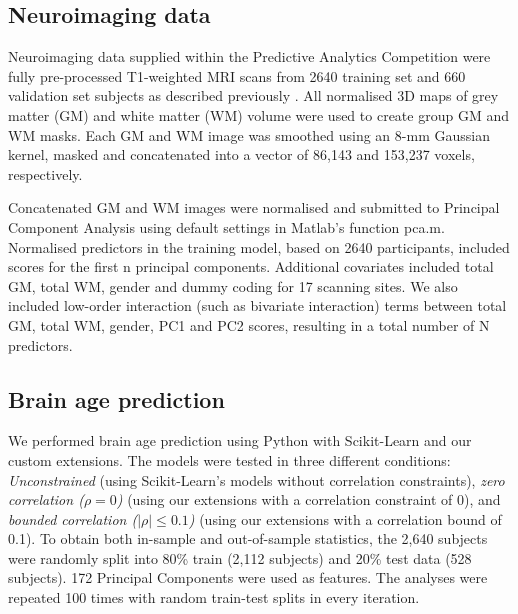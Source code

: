 \documentclass[utf8]{frontiersSCNS} %
\begin{document}

\subsection{Neuroimaging data}\label{sec:neuroimaging}
Neuroimaging data supplied within the Predictive Analytics Competition were fully pre-processed T1-weighted MRI scans from 2640 training set and 660 validation set subjects as described previously \citep{Cole2017PredictingBiomarker}. All normalised 3D maps of grey matter (GM) and white matter (WM) volume were used to create group GM and WM masks. Each GM and WM image was smoothed using an 8-mm Gaussian kernel, masked and concatenated into a vector of 86,143 and 153,237 voxels, respectively. 

Concatenated GM and WM images were normalised and submitted to Principal Component Analysis using default settings in Matlab’s function pca.m. Normalised predictors in the training model, based on 2640 participants, included scores for the first n principal components. Additional covariates included total GM, total WM, gender and dummy coding for 17 scanning sites. We also included low-order interaction (such as bivariate interaction) terms between total GM, total WM, gender, PC1 and PC2 scores, resulting in a total number of N predictors.

\subsection{Brain age prediction}\label{sec:brain_age_prediction}

We performed brain age prediction using Python with Scikit-Learn and our custom extensions. The models were tested in three different conditions: \textit{Unconstrained} (using Scikit-Learn's models without correlation constraints), \textit{zero correlation ($\rho=0$)} (using our extensions with a correlation constraint of 0), and \textit{bounded correlation ($|\rho|\le0.1$)} (using our extensions with a correlation bound of 0.1). To obtain both in-sample and out-of-sample statistics, the 2,640 subjects were randomly split into 80\% train (2,112 subjects) and 20\% test data (528 subjects). 172 Principal Components were used as features. The analyses were repeated 100 times with random train-test splits in every iteration.
\end{document}
